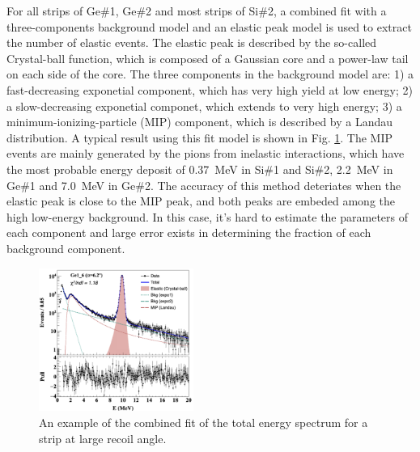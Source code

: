 \documentclass[fleqn,twocolumn,a4paper]{ikpar}
\begin{document}
For all strips of Ge\#1, Ge\#2 and most strips of Si\#2, a combined fit with
a three-components background model and an elastic peak model is used to extract
the number of elastic events.
The elastic peak is described by the so-called Crystal-ball function\cite{r1}, which
is composed of a Gaussian core and a power-law tail on each side of the core.
The three components in the background model are: 1) a
fast-decreasing exponetial component, which has very high yield at low energy; 2)
a slow-decreasing exponetial componet, which extends to very high energy; 3) a
minimum-ionizing-particle (MIP) component, which is described by a Landau
distribution.
A typical result using this fit model is shown in Fig. \ref{fig:combined_fit}.
The MIP events are mainly generated by the pions from inelastic interactions,
which have the most probable energy deposit of \SI{0.37}{\MeV} in Si\#1 and Si\#2,
\SI{2.2}{\MeV} in Ge\#1 and \SI{7.0}{\MeV} in Ge\#2.
The accuracy of this method deteriates when the elastic peak is close to the MIP
peak, and both peaks are embeded among the high low-energy background.
In this case, it's hard to estimate the parameters of each component and large
error exists in determining the fraction of each background component.
\begin{figure}[!htb]
	\includegraphics[width=0.45\textwidth]{./combined_fit.png}
  \caption{An example of the combined fit of the total energy spectrum for a strip at large recoil angle.}
  \label{fig:combined_fit}
\end{figure}

\par
\medskip
\end{document}
